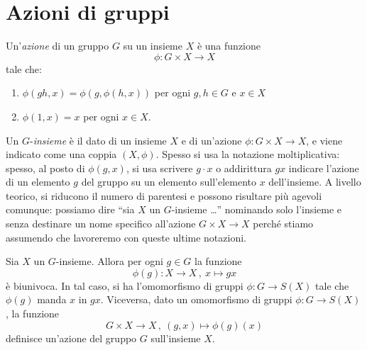
\section{Azioni di gruppi}

\begin{defi}\label{defi:azioni}
Un'{\em azione} di un gruppo $G$ su un insieme $X$ è una funzione
\[\phi : G \times X \to X\]
tale che:
\begin{enumerate}[ref=(\arabic* in Definizione~\ref{defi:azioni})]
\item  $\phi(gh, x) = \phi(g, \phi(h, x))$ per ogni $g,h \in G$ e $x \in X$ \label{item:ActionAxiom1}
\item  $\phi(1, x) = x$ per ogni $x \in X$. \label{item:ActionAxiom2}
\end{enumerate}
Un $G$-{\em insieme} è il dato di un insieme $X$ e di un'azione $\phi : G \times X \to X$, e viene indicato come una coppia $(X, \phi)$. Spesso si usa la notazione moltiplicativa: spesso, al posto di $\phi(g, x)$, si usa scrivere $g \cdot x$ o addirittura $gx$ indicare l'azione di un elemento $g$ del gruppo su un elemento sull'elemento $x$ dell'insieme. A livello teorico, si riducono il numero di parentesi e possono risultare più agevoli comunque: possiamo dire \enquote{sia $X$ un $G$-insieme \dots{}} nominando solo l'insieme e senza destinare un nome specifico all'azione $G \times X \to X$ perché stiamo assumendo che lavoreremo con queste ultime notazioni.
\end{defi}


\begin{prop}\label{prop:AzioniComeOmomorfismi}
Sia $X$ un $G$-insieme. Allora per ogni $g \in G$ la funzione
\[\phi(g) : X \to X \,,\ x \mapsto gx\]
è biunivoca. In tal caso, si ha l'omomorfismo di gruppi $\phi : G\to S(X)$ tale che $\phi(g)$ manda $x$ in $gx$. Viceversa, dato un omomorfismo di gruppi $\phi : G\to S(X)$, la funzione
\[G \times X \to X \,,\ (g,x) \mapsto \phi(g)(x)\]
definisce un'azione del gruppo $G$ sull'insieme $X$.
\end{prop}

